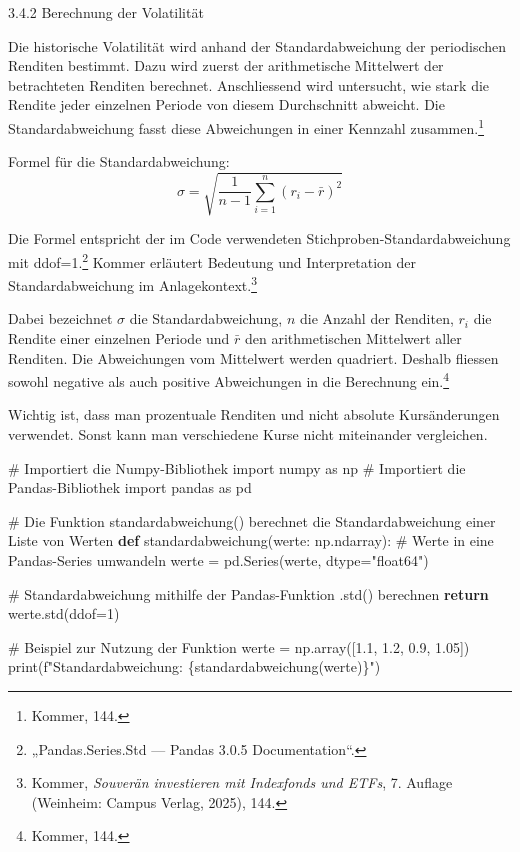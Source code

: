 \documentclass[
  ngerman,
  a4paper,
  DIV=11,
  oneside]{scrreprt}
\newenvironment{Shaded}{\begin{snugshade}}{\end{snugshade}}
\newcommand{\BuiltInTok}[1]{\textcolor[rgb]{0.00,0.23,0.31}{#1}}
\newcommand{\CommentTok}[1]{\textcolor[rgb]{0.37,0.37,0.37}{#1}}
\newcommand{\ControlFlowTok}[1]{\textcolor[rgb]{0.00,0.23,0.31}{\textbf{#1}}}
\newcommand{\DecValTok}[1]{\textcolor[rgb]{0.68,0.00,0.00}{#1}}
\newcommand{\FloatTok}[1]{\textcolor[rgb]{0.68,0.00,0.00}{#1}}
\newcommand{\ImportTok}[1]{\textcolor[rgb]{0.00,0.46,0.62}{#1}}
\newcommand{\KeywordTok}[1]{\textcolor[rgb]{0.00,0.23,0.31}{\textbf{#1}}}
\newcommand{\NormalTok}[1]{\textcolor[rgb]{0.00,0.23,0.31}{#1}}
\newcommand{\OperatorTok}[1]{\textcolor[rgb]{0.37,0.37,0.37}{#1}}
\newcommand{\SpecialCharTok}[1]{\textcolor[rgb]{0.37,0.37,0.37}{#1}}
\newcommand{\SpecialStringTok}[1]{\textcolor[rgb]{0.13,0.47,0.30}{#1}}
\newcommand{\StringTok}[1]{\textcolor[rgb]{0.13,0.47,0.30}{#1}}
\begin{document}
3.4.2 Berechnung der Volatilität

Die historische Volatilität wird anhand der Standardabweichung der
periodischen Renditen bestimmt. Dazu wird zuerst der arithmetische
Mittelwert der betrachteten Renditen berechnet. Anschliessend wird
untersucht, wie stark die Rendite jeder einzelnen Periode von diesem
Durchschnitt abweicht. Die Standardabweichung fasst diese Abweichungen
in einer Kennzahl zusammen.\footnote{Kommer, 144.}

Formel für die Standardabweichung: \[
\sigma = \sqrt{\frac{1}{n-1}\sum_{i=1}^{n}(r_i-\bar{r})^2}
\]

Die Formel entspricht der im Code verwendeten
Stichproben-Standardabweichung mit ddof=1.\footnote{{„Pandas.{Series}.Std
  --- Pandas 3.0.5 Documentation``}.} Kommer erläutert Bedeutung und
Interpretation der Standardabweichung im Anlagekontext.\footnote{Kommer,
  \emph{Souverän investieren mit Indexfonds und ETFs}, 7. Auflage
  (Weinheim: Campus Verlag, 2025), 144.}

Dabei bezeichnet \textbf{\(\sigma\)} die Standardabweichung,
\textbf{\(n\)} die Anzahl der Renditen, \textbf{\(r_i\)} die Rendite
einer einzelnen Periode und \textbf{\(\bar r\)} den arithmetischen
Mittelwert aller Renditen. Die Abweichungen vom Mittelwert werden
quadriert. Deshalb fliessen sowohl negative als auch positive
Abweichungen in die Berechnung ein.\footnote{Kommer, 144.}

Wichtig ist, dass man prozentuale Renditen und nicht absolute
Kursänderungen verwendet. Sonst kann man verschiedene Kurse nicht
miteinander vergleichen.

\begin{Shaded}
\begin{Highlighting}[]
\CommentTok{\# Importiert die Numpy{-}Bibliothek}
\ImportTok{import}\NormalTok{ numpy }\ImportTok{as}\NormalTok{ np}
\CommentTok{\# Importiert die Pandas{-}Bibliothek}
\ImportTok{import}\NormalTok{ pandas }\ImportTok{as}\NormalTok{ pd}

\CommentTok{\# Die Funktion standardabweichung() berechnet die Standardabweichung einer Liste von Werten}
\KeywordTok{def}\NormalTok{ standardabweichung(werte: np.ndarray):}
    \CommentTok{\# Werte in eine Pandas{-}Series umwandeln}
\NormalTok{    werte }\OperatorTok{=}\NormalTok{ pd.Series(werte, dtype}\OperatorTok{=}\StringTok{"float64"}\NormalTok{)}

    \CommentTok{\# Standardabweichung mithilfe der Pandas{-}Funktion .std() berechnen}
    \ControlFlowTok{return}\NormalTok{ werte.std(ddof}\OperatorTok{=}\DecValTok{1}\NormalTok{)}


\CommentTok{\# Beispiel zur Nutzung der Funktion}
\NormalTok{werte }\OperatorTok{=}\NormalTok{ np.array([}\FloatTok{1.1}\NormalTok{, }\FloatTok{1.2}\NormalTok{, }\FloatTok{0.9}\NormalTok{, }\FloatTok{1.05}\NormalTok{])}
\BuiltInTok{print}\NormalTok{(}\SpecialStringTok{f"Standardabweichung: }\SpecialCharTok{\{}\NormalTok{standardabweichung(werte)}\SpecialCharTok{\}}\SpecialStringTok{"}\NormalTok{)}
\end{Highlighting}
\end{Shaded}
\end{document}
